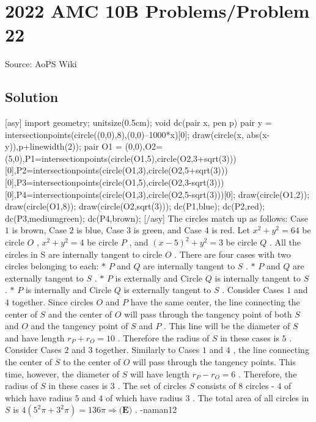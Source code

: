 \documentclass[12pt]{article}
\begin{document}
\section*{{2022 AMC 10B Problems/Problem 22}}
Source: AoPS Wiki

\subsection*{Solution}
[asy] import geometry; unitsize(0.5cm); void dc(pair x, pen p) { pair y = intersectionpoints(circle((0,0),8),(0,0)--1000*x)[0]; draw(circle(x, abs(x-y)),p+linewidth(2)); } pair O1 = (0,0),O2=(5,0),P1=intersectionpoints(circle(O1,5),circle(O2,3+sqrt(3)))[0],P2=intersectionpoints(circle(O1,3),circle(O2,5+sqrt(3)))[0],P3=intersectionpoints(circle(O1,5),circle(O2,3-sqrt(3)))[0],P4=intersectionpoints(circle(O1,3),circle(O2,5-sqrt(3)))[0]; draw(circle(O1,2)); draw(circle(O1,8)); draw(circle(O2,sqrt(3))); dc(P1,blue); dc(P2,red); dc(P3,mediumgreen); dc(P4,brown); [/asy] The circles match up as follows: Case $1$ is brown, Case $2$ is blue, Case $3$ is green, and Case 4 is red.
Let $x^2 + y^2 = 64$ be circle $O$ , $x^2 + y^2 = 4$ be circle $P$ , and $(x-5)^2 + y^2 = 3$ be circle $Q$ .
All the circles in S are internally tangent to circle $O$ .
There are four cases with two circles belonging to each: $*$ $P$ and $Q$ are internally tangent to $S$ . $*$ $P$ and $Q$ are externally tangent to $S$ . $*$ $P$ is externally and Circle $Q$ is internally tangent to $S$ . $*$ $P$ is internally and Circle $Q$ is externally tangent to $S$ . Consider Cases $1$ and $4$ together. Since circles $O$ and $P$ have the same center, the line connecting the center of $S$ and the center of $O$ will pass through the tangency point of both $S$ and $O$ and the tangency point of $S$ and $P$ . This line will be the diameter of $S$ and have length $r_P + r_O = 10$ . Therefore the radius of $S$ in these cases is $5$ . Consider Cases $2$ and $3$ together. Similarly to Cases $1$ and $4$ , the line connecting the center of $S$ to the center of $O$ will pass through the tangency points. This time, however, the diameter of $S$ will have length $r_P-r_O=6$ . Therefore, the radius of $S$ in these cases is $3$ . The set of circles $S$ consists of $8$ circles - $4$ of which have radius $5$ and $4$ of which have radius $3$ .
The total area of all circles in $S$ is $4(5^2\pi + 3^2\pi) = 136\pi \Rightarrow \boxed{\textbf{(E)}}$ . -naman12
\end{document}
